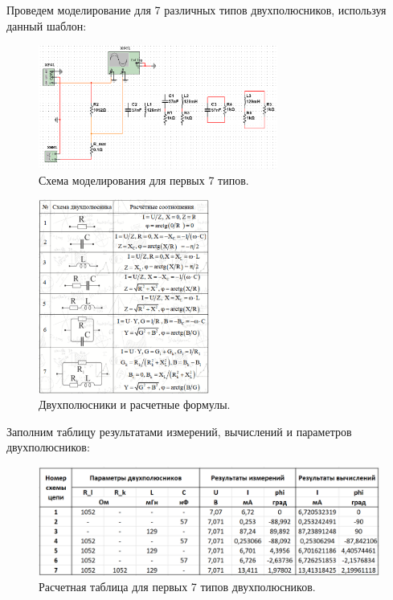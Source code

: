 \documentclass[12pt]{article}
\begin{document}
Проведем моделирование для 7 различных типов двухполюсников, используя данный шаблон:

\begin{figure}[H]
    \centering
    \includegraphics[width=0.7\textwidth]{scheme.png}
    \caption{Схема моделирования для первых 7 типов.}
    \label{fig:scheme}
\end{figure}

\begin{figure}[H]
    \centering
    \includegraphics[width=0.5\textwidth]{table.png}
    \caption{Двухполюсники и расчетные формулы.}
    \label{fig:table}
\end{figure}

Заполним таблицу результатами измерений, вычислений и параметров двухполюсников:
\begin{figure}[H]
    \centering
    \includegraphics[width=\textwidth]{table_1_7.png}
    \caption{Расчетная таблица для первых 7 типов двухполюсников.}
    \label{fig:table_1_7}
\end{figure}
\end{document}
